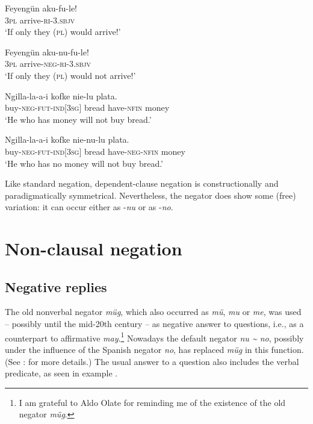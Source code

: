 \documentclass[output=paper,colorlinks,citecolor=brown,draft]{langscibook}
\begin{document}
\ea\label{ex:mapu:17}
    
    \ea\label{ex:mapu:17a}
        \gll Feyengün  aku-fu-le! \\ 
             \textsc{3pl} arrive-\textsc{ri-3.sbjv} \\
        \glt ‘If only they (\textsc{pl}) would arrive!’
    
    \ex\label{ex:mapu:17b}
        \gll Feyengün  aku-nu-fu-le! \\
             3\textsc{pl} arrive-\textsc{neg-ri-3.sbjv} \\
        \glt ‘If only they (\textsc{pl}) would not arrive!’ \citep[184]{Smeets2008}
    \z
\z 
 

\ea\label{ex:mapu:18}
    
    \ea\label{ex:mapu:18a}
        \gll Ngilla-la-a-i kofke  nie-lu plata. \\ 
             buy-\textsc{neg-fut-ind[3sg]} bread have-\textsc{nfin} money \\
        \glt ‘He who has money will not buy bread.’
    
    \ex\label{ex:mapu:18b}
        \gll Ngilla-la-a-i kofke  nie-nu-lu plata.\\
             buy-\textsc{neg-fut-ind[3sg]} bread  have-\textsc{neg-nfin} money\\
        \glt  ‘He who has no money will not buy bread.’ \citep[189]{Smeets2008}
    \z
\z 


Like standard negation, dependent-clause negation is constructionally and paradigmatically symmetrical. Nevertheless, the negator does show some (free) variation: it can occur either as \nobreakdash-\textit{nu} or as \nobreakdash-\textit{no}.


\section{Non-clausal negation}
\label{sec:mapu:3}

\subsection{Negative replies}
\label{sec:mapu:3.1}

The old nonverbal negator \textit{müg}, which also occurred as \textit{mü}, \textit{mu} or \textit{me}, was used – possibly until the mid-20th century – as negative answer to questions, i.e., as a counterpart to affirmative \textit{may}.\footnote{I am grateful to Aldo Olate for reminding me of the existence of the old negator \textit{müg}.} Nowadays the default negator \textit{nu {\textasciitilde} no}, possibly under the influence of the Spanish negator \textit{no}, has replaced \textit{müg} in this function. (See \citealt[166--167]{Moesbach1962}: for more details.) The usual answer to a question also includes the verbal predicate, as seen in example .
\end{document}
